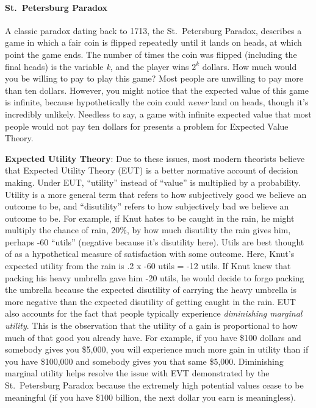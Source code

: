 \documentclass[
]{krantz}
\begin{document}
\paragraph*{St.~Petersburg Paradox}\label{st.-petersburg-paradox}

A classic paradox dating back to 1713, the St.~Petersburg Paradox, describes a game in which a fair coin is flipped repeatedly until it lands on heads, at which point the game ends. The number of times the coin was flipped (including the final heads) is the variable \emph{k}, and the player wins \(2^k\) dollars. How much would you be willing to pay to play this game? Most people are unwilling to pay more than ten dollars. However, you might notice that the expected value of this game is infinite, because hypothetically the coin could \emph{never} land on heads, though it's incredibly unlikely. Needless to say, a game with infinite expected value that most people would not pay ten dollars for presents a problem for Expected Value Theory.

\textbf{Expected Utility Theory}: Due to these issues, most modern theorists believe that Expected Utility Theory (EUT) is a better normative account of decision making. Under EUT, ``utility'' instead of ``value'' is multiplied by a probability. Utility is a more general term that refers to how subjectively good we believe an outcome to be, and ``disutility'' refers to how subjectively bad we believe an outcome to be. For example, if Knut hates to be caught in the rain, he might multiply the chance of rain, 20\%, by how much disutility the rain gives him, perhaps -60 ``utils'' (negative because it's disutility here). Utils are best thought of as a hypothetical measure of satisfaction with some outcome. Here, Knut's expected utility from the rain is .2 x -60 utils = -12 utils. If Knut knew that packing his heavy umbrella gave him -20 utils, he would decide to forgo packing the umbrella because the expected disutility of carrying the heavy umbrella is more negative than the expected disutility of getting caught in the rain. EUT also accounts for the fact that people typically experience \emph{diminishing marginal utility}. This is the observation that the utility of a gain is proportional to how much of that good you already have. For example, if you have \$100 dollars and somebody gives you \$5,000, you will experience much more gain in utility than if you have \$100,000 and somebody gives you that same \$5,000. Diminishing marginal utility helps resolve the issue with EVT demonstrated by the St.~Petersburg Paradox because the extremely high potential values cease to be meaningful (if you have \$100 billion, the next dollar you earn is meaningless).
\end{document}
